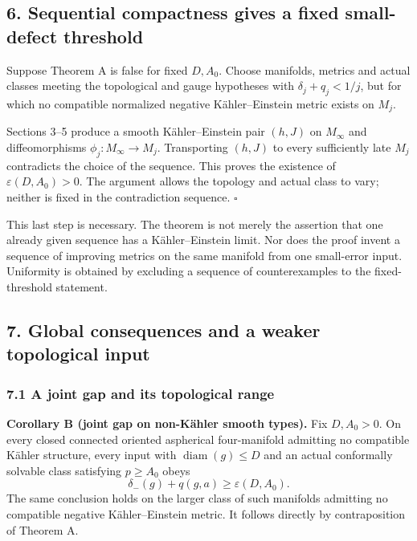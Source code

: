 \documentclass[
  11pt,
]{article}
\begin{document}
\hypertarget{sequential-compactness-gives-a-fixed-small-defect-threshold}{%
\subsection{6. Sequential compactness gives a fixed small-defect
threshold}\label{sequential-compactness-gives-a-fixed-small-defect-threshold}}

Suppose Theorem A is false for fixed \(D,A_0\). Choose manifolds,
metrics and actual classes meeting the topological and gauge hypotheses
with \(\delta_j+q_j<1/j\), but for which no compatible normalized
negative Kähler--Einstein metric exists on \(M_j\).

Sections 3--5 produce a smooth Kähler--Einstein pair \((h,J)\) on
\(M_\infty\) and diffeomorphisms \(\phi_j:M_\infty\to M_j\).
Transporting \((h,J)\) to every sufficiently late \(M_j\) contradicts
the choice of the sequence. This proves the existence of
\(\varepsilon(D,A_0)>0\). The argument allows the topology and actual
class to vary; neither is fixed in the contradiction sequence.
\(\square\)

This last step is necessary. The theorem is not merely the assertion
that one already given sequence has a Kähler--Einstein limit. Nor does
the proof invent a sequence of improving metrics on the same manifold
from one small-error input. Uniformity is obtained by excluding a
sequence of counterexamples to the fixed-threshold statement.

\hypertarget{global-consequences-and-a-weaker-topological-input}{%
\subsection{7. Global consequences and a weaker topological
input}\label{global-consequences-and-a-weaker-topological-input}}

\hypertarget{a-joint-gap-and-its-topological-range}{%
\subsubsection{7.1 A joint gap and its topological
range}\label{a-joint-gap-and-its-topological-range}}

\textbf{Corollary B (joint gap on non-Kähler smooth types).} Fix
\(D,A_0>0\). On every closed connected oriented aspherical four-manifold
admitting no compatible Kähler structure, every input with
\(\operatorname{diam}(g)\le D\) and an actual conformally solvable class
satisfying \(p\ge A_0\) obeys \[
                         \delta_-(g)+q(g,a)
                              \ge\varepsilon(D,A_0).
 \tag{22}
\] The same conclusion holds on the larger class of such manifolds
admitting no compatible negative Kähler--Einstein metric. It follows
directly by contraposition of Theorem A.
\end{document}
